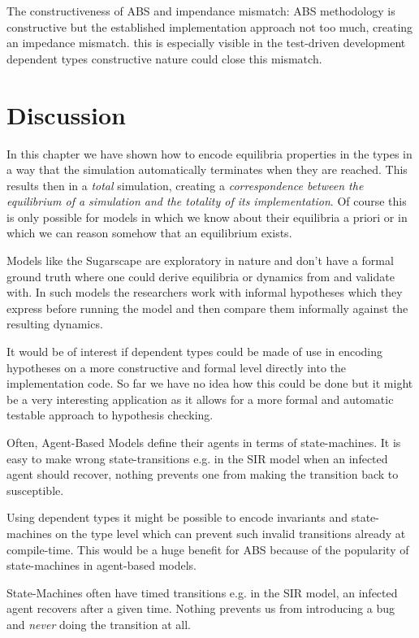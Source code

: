 The constructiveness of ABS and impendance mismatch: ABS methodology is constructive but the established implementation approach not too much, creating an impedance mismatch. this is especially visible in the test-driven development dependent types constructive nature could close this mismatch.

\section{Discussion}
In this chapter we have shown how to  encode equilibria properties in the types in a way that the simulation automatically terminates when they are reached. This results then in a \textit{total} simulation, creating a \textit{correspondence between the equilibrium of a simulation and the totality of its implementation}. Of course this is only possible for models in which we know about their equilibria a priori or in which we can reason somehow that an equilibrium exists.

Models like the Sugarscape are exploratory in nature and don't have a formal ground truth where one could derive equilibria or dynamics from and validate with. In such models the researchers work with informal hypotheses which they express before running the model and then compare them informally against the resulting dynamics.

It would be of interest if dependent types could be made of use in encoding hypotheses on a more constructive and formal level directly into the implementation code. So far we have no idea how this could be done but it might be a very interesting application as it allows for a more formal and automatic testable approach to hypothesis checking.

Often, Agent-Based Models define their agents in terms of state-machines. It is easy to make wrong state-transitions e.g. in the SIR model when an infected agent should recover, nothing prevents one from making the transition back to susceptible. 

Using dependent types it might be possible to encode invariants and state-machines on the type level which can prevent such invalid transitions already at compile-time. This would be a huge benefit for ABS because of the popularity of state-machines in agent-based models.

State-Machines often have timed transitions e.g. in the SIR model, an infected agent recovers after a given time. Nothing prevents us from introducing a bug and \textit{never} doing the transition at all.

